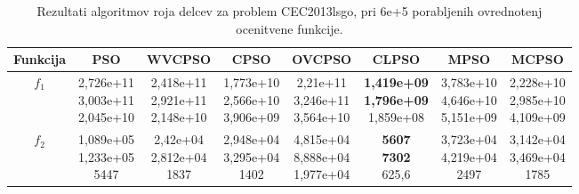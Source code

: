 \begin{table}[t]
    \renewcommand{\arraystretch}{1.1}
    \centering
    \caption{Rezultati algoritmov roja delcev za problem CEC2013lsgo, pri 6e+5 porabljenih ovrednotenj ocenitvene funkcije.} \label{tab:bech:opt_two_stats}
    \begin{small}
    \begin{tabular}{|c|c|c|c|c|c|c|c|}
        \hline
        Funkcija & PSO & WVCPSO & CPSO & OVCPSO & CLPSO & MPSO & MCPSO \\\hline
        $f_1$    & \makecell{2,726e+11 \\ 3,003e+11 \\ 2,045e+10} & \makecell{2,418e+11 \\ 2,921e+11 \\ 2,148e+10} & \makecell{1,773e+10 \\ 2,566e+10 \\ 3,906e+09} & \makecell{2,21e+11 \\ 3,246e+11 \\ 3,564e+10} & \makecell{\textbf{1,419e+09} \\ \textbf{1,796e+09} \\ 1,859e+08} & \makecell{3,783e+10 \\ 4,646e+10 \\ 5,151e+09} & \makecell{2,228e+10 \\ 2,985e+10 \\ 4,109e+09} \\\hline
        $f_2$    & \makecell{1,089e+05 \\ 1,233e+05 \\ 5447}      & \makecell{2,42e+04 \\ 2,812e+04 \\ 1837}       & \makecell{2,948e+04 \\ 3,295e+04 \\ 1402}      & \makecell{4,815e+04 \\ 8,888e+04 \\ 1,977e+04} & \makecell{\textbf{5607} \\ \textbf{7302} \\ 625,6}               & \makecell{3,723e+04 \\ 4,219e+04 \\ 2497}      & \makecell{3,142e+04 \\ 3,469e+04 \\ 1785}      \\\hline

\end{tabular}
\end{small}
\end{table}
